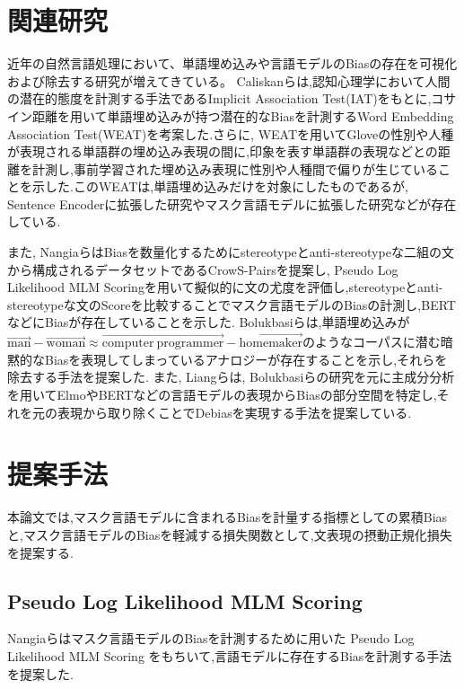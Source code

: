 \documentclass[
  platex, dvipdfmx %
]{nlp2021}
\begin{document}
\section{関連研究}
近年の自然言語処理において、単語埋め込みや言語モデルのBiasの存在を可視化および除去する研究が増えてきている。
Caliskanら\cite{caliskan2017}は,認知心理学において人間の潜在的態度を計測する手法であるImplicit Association Test(IAT)\cite{Greenwald98measuringindividual}をもとに,コサイン距離を用いて単語埋め込みが持つ潜在的なBiasを計測するWord Embedding Association Test(WEAT)を考案した.さらに, WEATを用いてGlove\cite{pennington2014glove}の性別や人種が表現される単語群の埋め込み表現の間に,印象を表す単語群の表現などとの距離を計測し,事前学習された埋め込み表現に性別や人種間で偏りが生じていることを示した.このWEATは,単語埋め込みだけを対象にしたものであるが, Sentence Encoderに拡張した研究\cite{may-etal-2019-measuring}やマスク言語モデルに拡張した研究\cite{kurita2019measuring}などが存在している.

また, Nangiaら\cite{nangia2020crows}はBiasを数量化するためにstereotypeとanti-stereotypeな二組の文から構成されるデータセットであるCrowS-Pairsを提案し, Pseudo Log Likelihood MLM Scoring\cite{salazar-etal-2020-masked}を用いて擬似的に文の尤度を評価し,stereotypeとanti-stereotypeな文のScoreを比較することでマスク言語モデルのBiasの計測し,BERTなどにBiasが存在していることを示した.
Bolukbasiら\cite{bolukbasi2016man}は,単語埋め込みが$\overrightarrow{\mathrm{man}}-\overrightarrow{\mathrm{woman}} \approx \overrightarrow{\mathrm{computer\ programmer}}-\overrightarrow{\mathrm{homemaker}}$のようなコーパスに潜む暗黙的なBiasを表現してしまっているアナロジーが存在することを示し,それらを除去する手法を提案した.
また, Liangら\cite{liang-etal-2020-towards}は, Bolukbasiらの研究を元に主成分分析を用いてElmoやBERTなどの言語モデルの表現からBiasの部分空間を特定し,それを元の表現から取り除くことでDebiasを実現する手法を提案している.

\section{提案手法}
本論文では,マスク言語モデルに含まれるBiasを計量する指標としての累積Biasと,マスク言語モデルのBiasを軽減する損失関数として,文表現の摂動正規化損失を提案する.

\subsection{Pseudo Log Likelihood MLM Scoring}
Nangiaら\cite{nangia2020crows}はマスク言語モデルのBiasを計測するために用いた Pseudo Log Likelihood MLM Scoring \cite{salazar-etal-2020-masked}をもちいて,言語モデルに存在するBiasを計測する手法を提案した.
\end{document}
